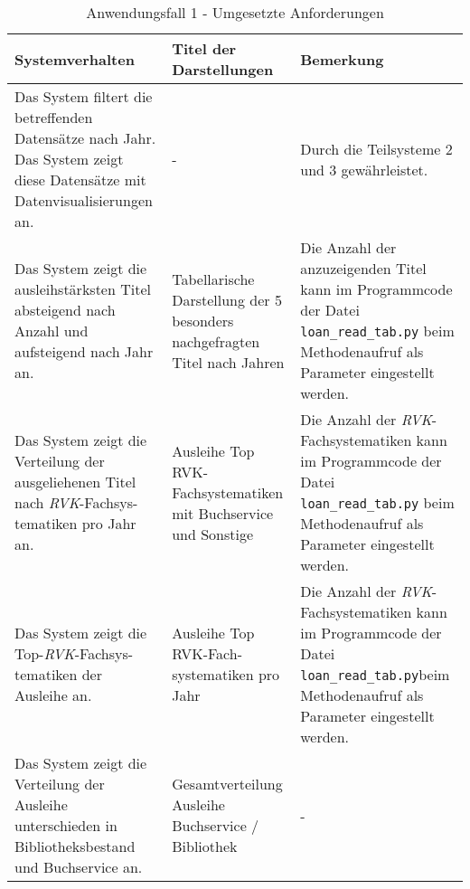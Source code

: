 \begingroup
    \setlength{\tabcolsep}{12pt} %
    \renewcommand{\arraystretch}{1.5} 
    \begin{table}[h]
        \Large
        \centering
        \begin{adjustbox}{max width=\textwidth}
        \begin{tabular}{p{}p{}p{}}
           \toprule
           Systemverhalten        &Titel der Darstellungen&Bemerkung\\
           \midrule
           Das System filtert die betreffenden Datensätze nach Jahr. Das System zeigt diese Datensätze mit Datenvisualisierungen an.&-&Durch die Teilsysteme 2  und 3 gewährleistet.\\
           Das System zeigt die ausleihstärksten Titel absteigend nach Anzahl und aufsteigend nach Jahr an.&Tabellarische Darstellung der 5 besonders nachgefragten Titel nach Jahren&Die Anzahl der anzuzeigenden Titel kann im Programmcode der Datei \texttt{loan\_read\_tab.py} beim Methodenaufruf als Parameter eingestellt werden.\\
           Das System zeigt die Verteilung der ausgeliehenen Titel nach \textit{\acrshort{RVK}}-Fachsys-tematiken pro Jahr an.&Ausleihe Top RVK-Fachsystematiken mit Buchservice und Sonstige&Die Anzahl der \textit{\acrshort{RVK}}-Fachsystematiken kann im Programmcode der Datei \texttt{loan\_read\_tab.py} beim Methodenaufruf als Parameter eingestellt werden.\\
           Das System zeigt die Top-\textit{\acrshort{RVK}}-Fachsys-tematiken der Ausleihe an.&Ausleihe Top RVK-Fach-systematiken pro Jahr\footnotemark&Die Anzahl der \textit{\acrshort{RVK}}-Fachsystematiken kann im Programmcode der Datei \texttt{loan\_read\_tab.py}beim Methodenaufruf als Parameter eingestellt werden.\\
           Das System zeigt die Verteilung der Ausleihe unterschieden in Bibliotheksbestand und Buchservice an.&Gesamtverteilung Ausleihe Buchservice / Bibliothek&-\\
        \bottomrule
        \end{tabular}
        \end{adjustbox}
        \caption{%
            Anwendungsfall 1 - Umgesetzte Anforderungen
        }
        \label{tab:Anwendungsfall 1 - Umgesetzte Anforderungen}
        \end{table}


